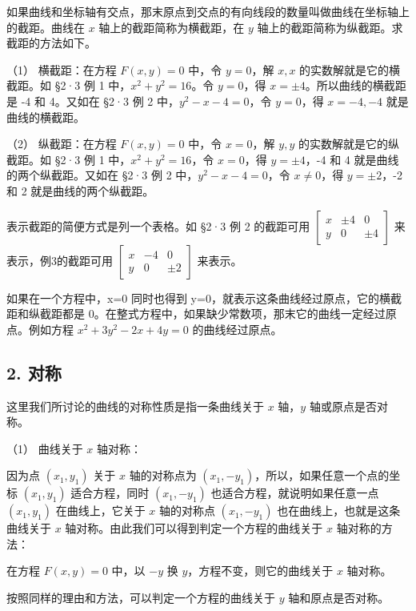 如果曲线和坐标轴有交点，那末原点到交点的有向线段的数量叫做曲线在坐标轴上的截距。曲线在
\(x\) 轴上的截距简称为横截距，在 \(y\)
轴上的截距简称为纵截距。求截距的方法如下。

（1） 横截距：在方程 \(F(x, y) = 0\) 中，令 \(y = 0\)，解 \(x, x\)
的实数解就是它的横截距。如 §2·3 例 1 中，\(x^2 + y^2 = 16\)。令
\(y = 0\)，得 \(x = \pm 4\)。所以曲线的横截距是 -4 和 4。又如在 §2·3 例
2 中，\(y^2 - x - 4 = 0\)，令 \(y = 0\)，得 \(x = -4, -4\)
就是曲线的横截距。

（2） 纵截距：在方程 \(F(x, y) = 0\) 中，令 \(x = 0\)，解 \(y, y\)
的实数解就是它的纵截距。如 §2·3 例 1 中，\(x^2 + y^2 = 16\)，令
\(x = 0\)，得 \(y = \pm 4\)，-4 和 4 就是曲线的两个纵截距。又如在 §2·3
例 2 中，\(y^{2} - x - 4 = 0\)，令 \(x \neq 0\)，得 \(y = \pm 2\)，-2 和
2 就是曲线的两个纵截距。

表示截距的简便方式是列一个表格。如 §2·3 例 2 的截距可用
\(\begin{bmatrix}x & \pm 4 & 0 \\ y & 0 & \pm 4\end{bmatrix}\)
来表示，例3的截距可用
\(\begin{bmatrix}x & -4 & 0 \\ y & 0 & \pm 2\end{bmatrix}\) 来表示。

如果在一个方程中，x=0 同时也得到
y=0，就表示这条曲线经过原点，它的横截距和纵截距都是
0。在整式方程中，如果缺少常数项，那末它的曲线一定经过原点。例如方程
\(x^{2}+3y^{2}-2x+4y=0\) 的曲线经过原点。

\subsection{2. 对称}\label{ux5bf9ux79f0}

这里我们所讨论的曲线的对称性质是指一条曲线关于 \(x\) 轴，\(y\)
轴或原点是否对称。

（1） 曲线关于 \(x\) 轴对称：

因为点 \((x_{1}, y_{1})\) 关于 \(x\) 轴的对称点为
\((x_{1}, -y_{1})\)，所以，如果任意一个点的坐标 \((x_{1}, y_{1})\)
适合方程，同时 \((x_{1}, -y_{1})\) 也适合方程，就说明如果任意一点
\((x_{1}, y_{1})\) 在曲线上，它关于 \(x\) 轴的对称点 \((x_{1}, -y_{1})\)
也在曲线上，也就是这条曲线关于 \(x\)
轴对称。由此我们可以得到判定一个方程的曲线关于 \(x\) 轴对称的方法：

在方程 \(F(x, y) = 0\) 中，以 \(-y\) 换 \(y\)，方程不变，则它的曲线关于
\(x\) 轴对称。

按照同样的理由和方法，可以判定一个方程的曲线关于 \(y\)
轴和原点是否对称。

